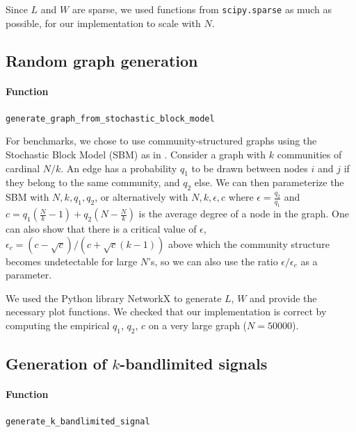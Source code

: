 \documentclass{article}
\begin{document}
Since $L$ and $W$ are sparse, we used functions from \verb#scipy.sparse# as much as possible, for our implementation to scale with $N$.


\subsection{Random graph generation} \label{subs:random_graph_generation}


\paragraph{Function} \verb#generate_graph_from_stochastic_block_model#


For benchmarks, we chose to use community-structured graphs using the Stochastic Block Model (SBM) as in \cite{tremblay2017}. Consider a graph with $k$ communities of cardinal $N/k$. An edge has a probability $q_1$ to be drawn between nodes $i$ and $j$ if they belong to the same community, and $q_2$ else. We can then parameterize the SBM with $N, k, q_1, q_2$, or alternatively with $N, k, \epsilon, c$ where $\epsilon = \frac{q_2}{q_1}$ and $c = q_1 \left( \frac{N}{k} - 1 \right) + q_2 \left(N - \frac{N}{k}\right)$ is the average degree of a node in the graph. One can also show that there is a critical value of $\epsilon$, $\epsilon_c = (c - \sqrt{c})/(c + \sqrt{c}(k-1))$ above which the community structure becomes undetectable for large $N$'s, so we can also use the ratio $\epsilon/\epsilon_c$ as a parameter.


We used the Python library NetworkX \cite{hagberg2008} to generate $L$, $W$ and provide the necessary plot functions. We checked that our implementation is correct by computing the empirical $q_1$, $q_2$, $c$ on a very large graph ($N=50000$).


\subsection[Generation of k-bandlimited signals]{Generation of $k$-bandlimited signals} \label{subsec:gen:k:bandlimited}


\paragraph{Function} \verb#generate_k_bandlimited_signal#
\end{document}
